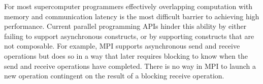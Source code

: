 For most supercomputer programmers effectively overlapping computation with
memory and communication latency is the most difficult barrier to achieving high
performance.  Current parallel programming APIs hinder this ability by either
failing to support asynchronous constructs, or by supporting constructs that are
not composable.  For example, MPI supports asynchronous send and receive operations
but does so in a way that later requires blocking to know when the send and receive 
operations have completed\cite{MPI}.  There is no way in MPI to launch a new 
operation contingent on the result of a blocking receive operation.  


